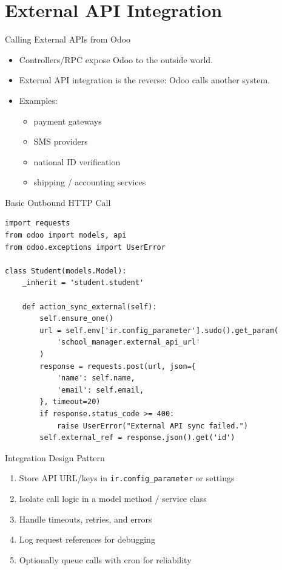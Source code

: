 \section{External API Integration}

\begin{frame}{Calling External APIs from Odoo}
	\begin{itemize}
		\item Controllers/RPC expose Odoo to the outside world.
		\item External API integration is the reverse: Odoo calls another system.
		\item Examples:
		\begin{itemize}
			\item payment gateways
			\item SMS providers
			\item national ID verification
			\item shipping / accounting services
		\end{itemize}
	\end{itemize}
\end{frame}

\begin{frame}[fragile]{Basic Outbound HTTP Call}
\begin{lstlisting}
import requests
from odoo import models, api
from odoo.exceptions import UserError

class Student(models.Model):
	_inherit = 'student.student'

	def action_sync_external(self):
		self.ensure_one()
		url = self.env['ir.config_parameter'].sudo().get_param(
			'school_manager.external_api_url'
		)
		response = requests.post(url, json={
			'name': self.name,
			'email': self.email,
		}, timeout=20)
		if response.status_code >= 400:
			raise UserError("External API sync failed.")
		self.external_ref = response.json().get('id')
\end{lstlisting}
\end{frame}

\begin{frame}[fragile]{Integration Design Pattern}
	\begin{enumerate}
		\item Store API URL/keys in \texttt{ir.config\_parameter} or settings
		\item Isolate call logic in a model method / service class
		\item Handle timeouts, retries, and errors
		\item Log request references for debugging
		\item Optionally queue calls with cron for reliability
	\end{enumerate}
\end{frame}

